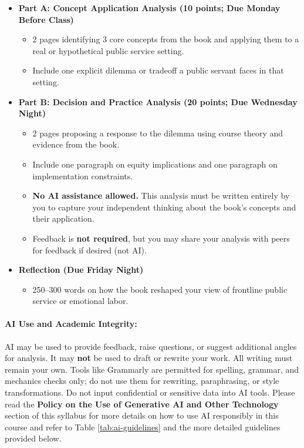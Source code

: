 \documentclass[11pt]{article}     %
\begin{document}
\begin{itemize}
    \item \textbf{Part A: Concept Application Analysis (10 points; Due Monday Before Class)}
    \begin{itemize}
        \item 2 pages identifying 3 core concepts from the book and applying them to a real or hypothetical public service setting.
        \item Include one explicit dilemma or tradeoff a public servant faces in that setting.
    \end{itemize}

    \item \textbf{Part B: Decision and Practice Analysis (20 points; Due Wednesday Night)}
    \begin{itemize}
        \item 2 pages proposing a response to the dilemma using course theory and evidence from the book.
        \item Include one paragraph on equity implications and one paragraph on implementation constraints.
        \item \textbf{No AI assistance allowed.} This analysis must be written entirely by you to capture your independent thinking about the book's concepts and their application.
        \item Feedback is \textbf{not required}, but you may share your analysis with peers for feedback if desired (not AI).
    \end{itemize}

    \item \textbf{Reflection (Due Friday Night)}
    \begin{itemize}
        \item 250--300 words on how the book reshaped your view of frontline public service or emotional labor.
    \end{itemize}
\end{itemize}

\paragraph*{AI Use and Academic Integrity:} AI may be used to provide feedback, raise questions, or suggest additional angles for analysis. It may \textbf{not} be used to draft or rewrite your work. All writing must remain your own. Tools like Grammarly are permitted for spelling, grammar, and mechanics checks only; do not use them for rewriting, paraphrasing, or style transformations. Do not input confidential or sensitive data into AI tools. Please read the \textbf{Policy on the Use of Generative AI and Other Technology} section of this syllabus for more details on how to use AI responsibly in this course and refer to Table \ref{tab:ai-guidelines} and the more detailed guidelines provided below.
\end{document}
